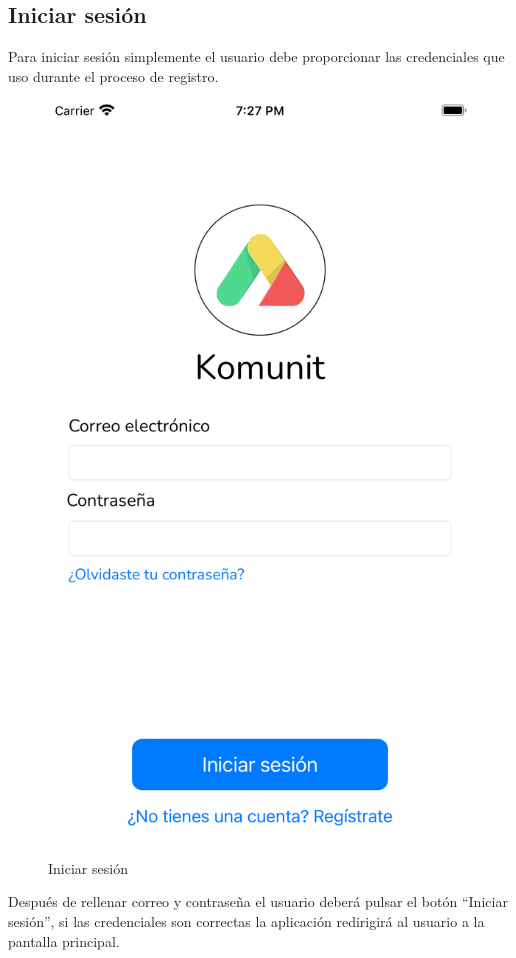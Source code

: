 \begin{appendices}
\section{Iniciar sesión}
Para iniciar sesión simplemente el usuario debe proporcionar las credenciales que uso durante el proceso de registro.
\begin{figure}[H]
        \centering
        \includegraphics[cframe=black 2pt,width=0.3\linewidth]{images/manual/login.png}
        \caption{Iniciar sesión}
        \label{fig:my_label}
\end{figure}
Después de rellenar correo y contraseña el usuario deberá pulsar el botón ``Iniciar sesión'', si las credenciales son correctas la aplicación redirigirá al usuario a la pantalla principal.


\end{appendices}
